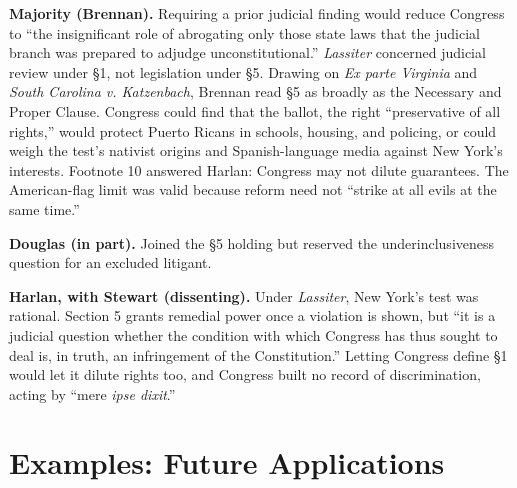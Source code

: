 \documentclass[12pt]{article}
\begin{document}
\textbf{Majority (Brennan).} Requiring a prior judicial finding would reduce Congress to ``the insignificant role of abrogating only those state laws that the judicial branch was prepared to adjudge unconstitutional.'' \textit{Lassiter} concerned judicial review under \S 1, not legislation under \S 5. Drawing on \textit{Ex parte Virginia} and \textit{South Carolina v. Katzenbach}, Brennan read \S 5 as broadly as the Necessary and Proper Clause. Congress could find that the ballot, the right ``preservative of all rights,'' would protect Puerto Ricans in schools, housing, and policing, or could weigh the test's nativist origins and Spanish-language media against New York's interests. Footnote 10 answered Harlan: Congress may not dilute guarantees. The American-flag limit was valid because reform need not ``strike at all evils at the same time.''

\textbf{Douglas (in part).} Joined the \S 5 holding but reserved the underinclusiveness question for an excluded litigant.

\textbf{Harlan, with Stewart (dissenting).} Under \textit{Lassiter}, New York's test was rational. Section 5 grants remedial power once a violation is shown, but ``it is a judicial question whether the condition with which Congress has thus sought to deal is, in truth, an infringement of the Constitution.'' Letting Congress define \S 1 would let it dilute rights too, and Congress built no record of discrimination, acting by ``mere \textit{ipse dixit}.''

\section{Examples: Future Applications}
\end{document}
